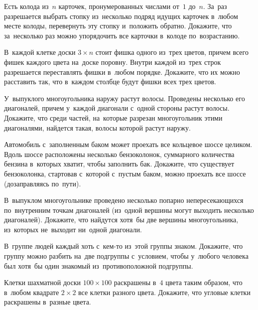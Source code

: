 


\begin{problems}

\item
Есть колода из~$n$ карточек, пронумерованных числами от~$1$ до~$n$.
За~раз разрешается выбрать стопку из~несколько подряд идущих карточек в~любом
месте колоды, перевернуть эту стопку и~положить обратно.
Докажите, что за~несколько раз можно упорядочить все карточки в~колоде
по~возрастанию.

\item
В~каждой клетке доски $3 \times n$ стоит фишка одного из~трех цветов, причем
всего фишек каждого цвета на~доске поровну.
Внутри каждой из~трех строк разрешается переставлять фишки в~любом порядке.
Докажите, что их можно расставить так, что в~каждом столбце будут фишки всех
трех цветов.

\item
У~выпуклого многоугольника наружу растут волосы.
Проведены несколько его диагоналей, причем у~каждой диагонали с~одной стороны
растут волосы.
Докажите, что среди частей, на~которые разрезан многоугольник этими
диагоналями, найдется такая, волосы которой растут наружу.

\item
Автомобиль с~заполненным баком может проехать все кольцевое шоссе целиком.
Вдоль шоссе расположены несколько бензоколонок, суммарного количества бензина
в~которых хватит, чтобы заполнить бак.
Докажите, что существует бензоколонка, стартовав с~которой с~пустым баком,
можно проехать все шоссе (дозаправляясь по~пути).

\item
В~выпуклом многоугольнике проведено несколько попарно непересекающихся
по~внутренним точкам диагоналей
(из~одной вершины могут выходить несколько диагоналей).
Докажите, что найдутся хотя~бы две вершины многоугольника, из~которых
не~выходит ни~одной диагонали.

\item
В~группе людей каждый хоть с~кем-то из~этой группы знаком.
Докажите, что группу можно разбить на~две подгруппы с~условием, чтобы у~любого
человека был хотя~бы один знакомый из~противоположной подгруппы.

\item
Клетки шахматной доски $100 \times 100$ раскрашены в~$4$ цвета таким образом,
что в~любом квадрате $2 \times 2$ все клетки разного цвета.
Докажите, что угловые клетки раскрашены в~разные цвета.


\end{problems}
